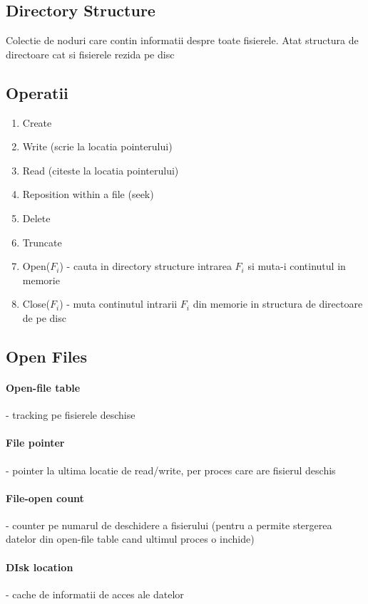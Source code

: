 \documentclass{article}
\begin{document}
\subsection*{Directory Structure}
Colectie de noduri care contin informatii despre toate fisierele. Atat structura de directoare cat si fisierele rezida pe disc

\subsection*{Operatii}
\begin{enumerate}
    \item Create
    \item Write (scrie la locatia pointerului)
    \item Read (citeste la locatia pointerului)
    \item Reposition within a file (seek)
    \item Delete
    \item Truncate
    \item Open($F_i$) - cauta in directory structure intrarea $F_i$ si muta-i continutul in memorie
    \item Close($F_i$) - muta continutul intrarii $F_i$ din memorie in structura de directoare de pe disc
\end{enumerate}

\subsection*{Open Files}
\paragraph*{Open-file table} - tracking pe fisierele deschise
\paragraph*{File pointer} - pointer la ultima locatie de read/write, per proces care are fisierul deschis
\paragraph*{File-open count} - counter pe numarul de deschidere a fisierului (pentru a permite stergerea datelor din open-file table cand ultimul proces o inchide)
\paragraph*{DIsk location} - cache de informatii de acces ale datelor
\end{document}
